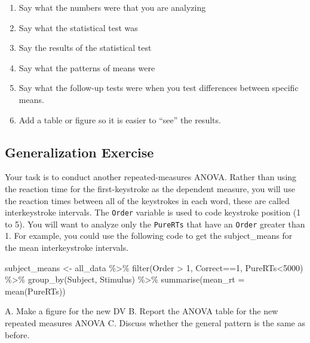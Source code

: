 \documentclass[
]{book}
\newenvironment{Shaded}{\begin{snugshade}}{\end{snugshade}}
\newcommand{\AttributeTok}[1]{\textcolor[rgb]{0.77,0.63,0.00}{#1}}
\newcommand{\DecValTok}[1]{\textcolor[rgb]{0.00,0.00,0.81}{#1}}
\newcommand{\FunctionTok}[1]{\textcolor[rgb]{0.00,0.00,0.00}{#1}}
\newcommand{\NormalTok}[1]{#1}
\newcommand{\OtherTok}[1]{\textcolor[rgb]{0.56,0.35,0.01}{#1}}
\newcommand{\SpecialCharTok}[1]{\textcolor[rgb]{0.00,0.00,0.00}{#1}}
\providecommand{\tightlist}{%
  \setlength{\itemsep}{0pt}\setlength{\parskip}{0pt}}
\begin{document}
\begin{enumerate}
\def\labelenumi{\arabic{enumi}.}
\tightlist
\item
  Say what the numbers were that you are analyzing
\item
  Say what the statistical test was
\item
  Say the results of the statistical test
\item
  Say what the patterns of means were
\item
  Say what the follow-up tests were when you test differences between specific means.
\item
  Add a table or figure so it is easier to ``see'' the results.
\end{enumerate}

\hypertarget{generalization-exercise-8}{%
\subsection{Generalization Exercise}\label{generalization-exercise-8}}

Your task is to conduct another repeated-measures ANOVA. Rather than using the reaction time for the first-keystroke as the dependent measure, you will use the reaction times between all of the keystrokes in each word, these are called interkeystroke intervals. The \texttt{Order} variable is used to code keystroke position (1 to 5). You will want to analyze only the \texttt{PureRTs} that have an \texttt{Order} greater than 1. For example, you could use the following code to get the subject\_means for the mean interkeystroke intervals.

\begin{Shaded}
\begin{Highlighting}[]
\NormalTok{subject\_means }\OtherTok{\textless{}{-}}\NormalTok{ all\_data }\SpecialCharTok{\%\textgreater{}\%}
                 \FunctionTok{filter}\NormalTok{(Order }\SpecialCharTok{\textgreater{}} \DecValTok{1}\NormalTok{, Correct}\SpecialCharTok{==}\DecValTok{1}\NormalTok{, PureRTs}\SpecialCharTok{\textless{}}\DecValTok{5000}\NormalTok{) }\SpecialCharTok{\%\textgreater{}\%}
                 \FunctionTok{group\_by}\NormalTok{(Subject, Stimulus) }\SpecialCharTok{\%\textgreater{}\%}
                 \FunctionTok{summarise}\NormalTok{(}\AttributeTok{mean\_rt =} \FunctionTok{mean}\NormalTok{(PureRTs))}
\end{Highlighting}
\end{Shaded}

A. Make a figure for the new DV
B. Report the ANOVA table for the new repeated measures ANOVA
C. Discuss whether the general pattern is the same as before.
\end{document}
